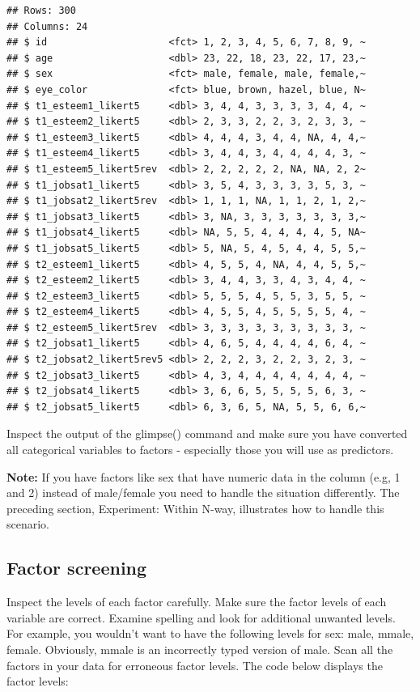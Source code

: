 \documentclass[
]{krantz}
\begin{document}
\begin{verbatim}
## Rows: 300
## Columns: 24
## $ id                     <fct> 1, 2, 3, 4, 5, 6, 7, 8, 9, ~
## $ age                    <dbl> 23, 22, 18, 23, 22, 17, 23,~
## $ sex                    <fct> male, female, male, female,~
## $ eye_color              <fct> blue, brown, hazel, blue, N~
## $ t1_esteem1_likert5     <dbl> 3, 4, 4, 3, 3, 3, 3, 4, 4, ~
## $ t1_esteem2_likert5     <dbl> 2, 3, 3, 2, 2, 3, 2, 3, 3, ~
## $ t1_esteem3_likert5     <dbl> 4, 4, 4, 3, 4, 4, NA, 4, 4,~
## $ t1_esteem4_likert5     <dbl> 3, 4, 4, 3, 4, 4, 4, 4, 3, ~
## $ t1_esteem5_likert5rev  <dbl> 2, 2, 2, 2, 2, NA, NA, 2, 2~
## $ t1_jobsat1_likert5     <dbl> 3, 5, 4, 3, 3, 3, 3, 5, 3, ~
## $ t1_jobsat2_likert5rev  <dbl> 1, 1, 1, NA, 1, 1, 2, 1, 2,~
## $ t1_jobsat3_likert5     <dbl> 3, NA, 3, 3, 3, 3, 3, 3, 3,~
## $ t1_jobsat4_likert5     <dbl> NA, 5, 5, 4, 4, 4, 4, 5, NA~
## $ t1_jobsat5_likert5     <dbl> 5, NA, 5, 4, 5, 4, 4, 5, 5,~
## $ t2_esteem1_likert5     <dbl> 4, 5, 5, 4, NA, 4, 4, 5, 5,~
## $ t2_esteem2_likert5     <dbl> 3, 4, 4, 3, 3, 4, 3, 4, 4, ~
## $ t2_esteem3_likert5     <dbl> 5, 5, 5, 4, 5, 5, 3, 5, 5, ~
## $ t2_esteem4_likert5     <dbl> 4, 5, 5, 4, 5, 5, 5, 5, 4, ~
## $ t2_esteem5_likert5rev  <dbl> 3, 3, 3, 3, 3, 3, 3, 3, 3, ~
## $ t2_jobsat1_likert5     <dbl> 4, 6, 5, 4, 4, 4, 4, 6, 4, ~
## $ t2_jobsat2_likert5rev5 <dbl> 2, 2, 2, 3, 2, 2, 3, 2, 3, ~
## $ t2_jobsat3_likert5     <dbl> 4, 3, 4, 4, 4, 4, 4, 4, 4, ~
## $ t2_jobsat4_likert5     <dbl> 3, 6, 6, 5, 5, 5, 5, 6, 3, ~
## $ t2_jobsat5_likert5     <dbl> 6, 3, 6, 5, NA, 5, 5, 6, 6,~
\end{verbatim}

Inspect the output of the glimpse() command and make sure you have converted all categorical variables to factors - especially those you will use as predictors.

\textbf{Note:} If you have factors like sex that have numeric data in the column (e.g, 1 and 2) instead of male/female you need to handle the situation differently. The preceding section, Experiment: Within N-way, illustrates how to handle this scenario.

\hypertarget{factor-screening-4}{%
\subsection{Factor screening}\label{factor-screening-4}}

Inspect the levels of each factor carefully. Make sure the factor levels of each variable are correct. Examine spelling and look for additional unwanted levels. For example, you wouldn't want to have the following levels for sex: male, mmale, female. Obviously, mmale is an incorrectly typed version of male. Scan all the factors in your data for erroneous factor levels. The code below displays the factor levels:
\end{document}
